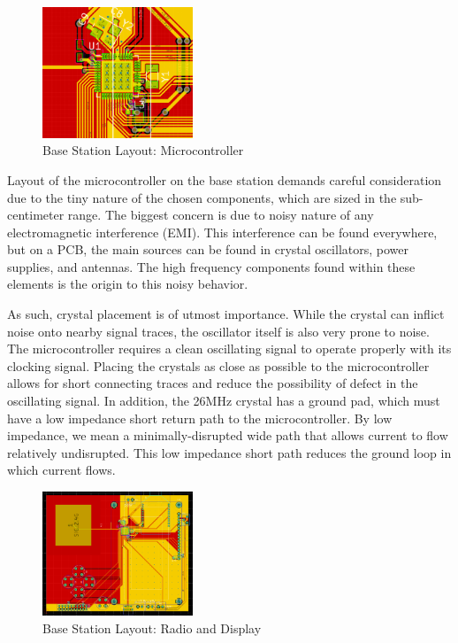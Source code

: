 \documentclass[journal,compsoc]{IEEEtran}
\begin{document}
\begin{figure}[ht] 	%
\centering
\includegraphics[width=0.4\textwidth]{base-layout-uc.PNG}
\caption{ \space Base Station Layout: Microcontroller}
\label{base-lay-uc}
\end{figure}
Layout of the microcontroller on the base station demands careful consideration due to the tiny nature of the chosen components, which are sized in the sub-centimeter range. The biggest  concern is due to noisy nature of any electromagnetic interference (EMI). This interference can be found everywhere, but on a PCB, the main sources can be found in crystal oscillators, power supplies, and antennas. The high frequency components found within these elements is the origin to this noisy behavior.

As such, crystal placement is of utmost importance. While the crystal can inflict noise onto nearby signal traces, the oscillator itself is also very prone to noise. The microcontroller requires a clean oscillating signal to operate properly with its clocking signal. Placing the crystals as close as possible to the microcontroller allows for short connecting traces and reduce the possibility of defect in the oscillating signal. In addition, the 26MHz crystal has a ground pad, which must have a low impedance short return path to the microcontroller. By low impedance, we mean a minimally-disrupted wide path that allows current to flow relatively undisrupted. This low impedance short path reduces the ground loop in which current flows.
\begin{figure}[ht] 	%
\centering
\includegraphics[width=0.4\textwidth]{base-layout-full.PNG}
\caption{ \space Base Station Layout: Radio and Display}
\label{base-lay-full}
\end{figure}
\end{document}
